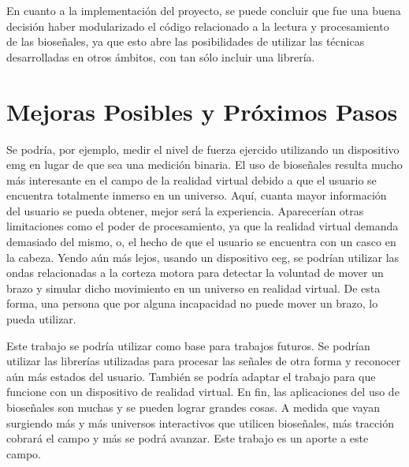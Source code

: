 En cuanto a la implementación del proyecto, se puede concluir que fue una buena decisión haber modularizado el código relacionado a la lectura y procesamiento de las bioseñales, ya que esto abre las posibilidades de utilizar las técnicas desarrolladas en otros ámbitos, con tan sólo incluir una librería.

\section{Mejoras Posibles y Próximos Pasos}

Se podría, por ejemplo, medir el nivel de fuerza ejercido utilizando un dispositivo \acrshort{emg} en lugar de que sea una medición binaria. El uso de bioseñales resulta mucho más interesante en el campo de la realidad virtual debido a que el usuario se encuentra totalmente inmerso en un universo. Aquí, cuanta mayor información del usuario se pueda obtener, mejor será la experiencia. Aparecerían otras limitaciones como el poder de procesamiento, ya que la realidad virtual demanda demasiado del mismo, o, el hecho de que el usuario se encuentra con un casco en la cabeza. Yendo aún más lejos, usando un dispositivo \acrshort{eeg}, se podrían utilizar las ondas relacionadas a la corteza motora para detectar la voluntad de mover un brazo y simular dicho movimiento en un universo en realidad virtual. De esta forma, una persona que por alguna incapacidad no puede mover un brazo, lo pueda utilizar.

Este trabajo se podría utilizar como base para trabajos futuros. Se podrían utilizar las librerías utilizadas para procesar las señales de otra forma y reconocer aún más estados del usuario. También se podría adaptar el trabajo para que funcione con un dispositivo de realidad virtual. En fin, las aplicaciones del uso de bioseñales son muchas y se pueden lograr grandes cosas. A medida que vayan surgiendo más y más universos interactivos que utilicen bioseñales, más tracción cobrará el campo y más se podrá avanzar. Este trabajo es un aporte a este campo.